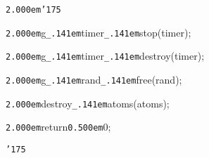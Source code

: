 \noindent
{}{\tt\mc \kern2.000em}{\tt\char'175}

\noindent
{}\hfill

\noindent
{}{\tt\mc \kern2.000em}g{\tt\_\kern.141em}timer{\tt\_\kern.141em}stop(timer);

\noindent
{}{\tt\mc \kern2.000em}g{\tt\_\kern.141em}timer{\tt\_\kern.141em}destroy(timer);

\noindent
{}\hfill

\noindent
{}{\tt\mc \kern2.000em}g{\tt\_\kern.141em}rand{\tt\_\kern.141em}free(rand);

\noindent
{}\hfill

\noindent
{}{\tt\mc \kern2.000em}destroy{\tt\_\kern.141em}atoms(atoms);

\noindent
{}{\tt\mc \kern2.000em}return{\tt\mc \kern0.500em}0;

\noindent
{}{\tt\char'175}

\noindent
{}

\rm\mc


